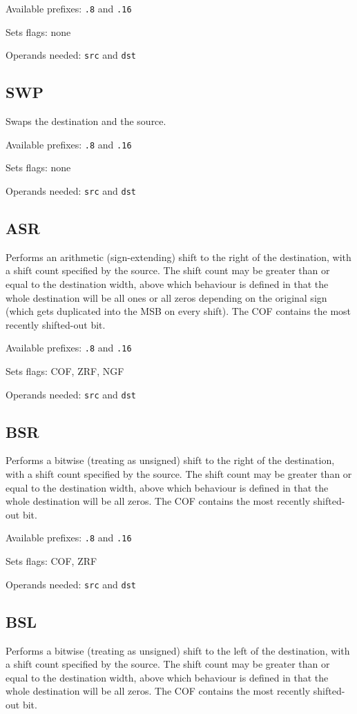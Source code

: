 \documentclass[12pt,a4paper]{report}
\begin{document}
Available prefixes: \texttt{.8} and \texttt{.16}

Sets flags: none

Operands needed: \texttt{src} and \texttt{dst}

\subsection*{SWP}
Swaps the destination and the source.

Available prefixes: \texttt{.8} and \texttt{.16}

Sets flags: none

Operands needed: \texttt{src} and \texttt{dst}

\subsection*{ASR}
Performs an arithmetic (sign-extending) shift to the right of the destination, with a shift count specified by the source. The shift count may be greater than or equal to the destination width, above which behaviour is defined in that the whole destination will be all ones or all zeros depending on the original sign (which gets duplicated into the MSB on every shift). The COF contains the most recently shifted-out bit.

Available prefixes: \texttt{.8} and \texttt{.16}

Sets flags: COF, ZRF, NGF

Operands needed: \texttt{src} and \texttt{dst}

\subsection*{BSR}
Performs a bitwise (treating as unsigned) shift to the right of the destination, with a shift count specified by the source. The shift count may be greater than or equal to the destination width, above which behaviour is defined in that the whole destination will be all zeros. The COF contains the most recently shifted-out bit.

Available prefixes: \texttt{.8} and \texttt{.16}

Sets flags: COF, ZRF

Operands needed: \texttt{src} and \texttt{dst}

\subsection*{BSL}
Performs a bitwise (treating as unsigned) shift to the left of the destination, with a shift count specified by the source. The shift count may be greater than or equal to the destination width, above which behaviour is defined in that the whole destination will be all zeros. The COF contains the most recently shifted-out bit.
\end{document}

